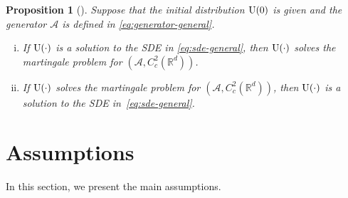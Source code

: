 \documentclass[11pt]{article}
\theoremstyle{plain}
\newtheorem{prop}{Proposition}[section]
\theoremstyle{definition}
\def\AM{{\mathcal A}}
\def\OM{{\mathcal O}}
\def\RB{{\mathbb R}}
\def\EB{{\mathbb E}}
\newcommand{\xhat}{{\hat{x}}}
\newcommand{\yhat}{{\hat{y}}}
\newcommand{\uu}{{\textnormal{U}}}
\begin{document}
\begin{prop}[{\cite[Chapter~5, Proposition~3.1 and Theorem~3.3]{ethier2009markov}}]
Suppose that the initial distribution $\uu(0)$ is given and the generator $\AM$ is defined in \eqref{eq:generator-general}.
    \begin{enumerate}[(i)]
        \item If $\uu(\cdot)$ is a solution to the SDE in \eqref{eq:sde-general}, then $\uu(\cdot)$ solves the martingale problem for $(\AM, C_c^2(\RB^d))$.
        \item If $\uu(\cdot)$ solves the martingale problem for $(\AM, C_c^2(\RB^d))$, then $\uu(\cdot)$ is a solution to the SDE in~\eqref{eq:sde-general}.
    \end{enumerate}
\end{prop}




\section{Assumptions}\label{sec:fclt:assump}

In this section, we present the main assumptions.


\end{document}
